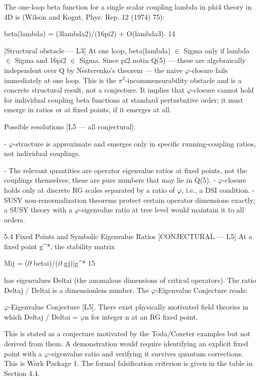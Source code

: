   The one-loop beta function for a single scalar coupling lambda in phi4 theory in 4D is
  (Wilson and Kogut, Phys. Rep. 12 (1974) 75):

  beta(lambda) = (3lambda2)/(16pi2) + O(lambda3). 14

  [Structural obstacle --- L3] At one loop, beta(lambda) $\in$ Sigma only if lambda $\in$ Sigma
  and 16pi2 $\in$ Sigma. Since pi2 notin Q(5) --- these are algebraically independent over Q
  by Nesterenko's theorem --- the naive $\varphi$-closure fails immediately at one loop. This is
  the $\pi^{2}$-incommensurability obstacle and is a concrete structural result, not a conjecture.
  It implies that $\varphi$-closure cannot hold for individual coupling beta functions at standard
  perturbative order; it must emerge in ratios or at fixed points, if it emerges at all.

  Possible resolutions [L5 --- all conjectural]:

  - $\varphi$-structure is approximate and emerges only in specific running-coupling ratios, not
  individual couplings.

  - The relevant quantities are operator eigenvalue ratios at fixed points, not the
  couplings themselves; these are pure numbers that may lie in Q(5).
  - $\varphi$-closure holds only at discrete RG scales separated by a ratio of $\varphi$, i.e., a DSI
  condition.
  - SUSY non-renormalization theorems protect certain operator dimensions exactly; a
  SUSY theory with a $\varphi$-eigenvalue ratio at tree level would maintain it to all orders.

  5.4 Fixed Points and Symbolic Eigenvalue Ratios [CONJECTURAL ---
  L5]
  At a fixed point g^*, the stability matrix

  Mij = ($\partial$ betai)/($\partial$ gj)|g^* 15

  has eigenvalues Deltai (the anomalous dimensions of critical operators). The ratio
  Deltaj / Deltai is a dimensionless number. The $\varphi$-Eigenvalue Conjecture reads:

          $\varphi$-Eigenvalue Conjecture [L5]. There exist physically motivated field theories in
          which Deltaj / Deltai = $\varphi$n for integer n at an RG fixed point.

  This is stated as a conjecture motivated by the Toda/Coxeter examples but not derived
  from them. A demonstration would require identifying an explicit fixed point with a
  $\varphi$-eigenvalue ratio and verifying it survives quantum corrections. This is Work Package
  1. The formal falsification criterion is given in the table in Section 4.4.

